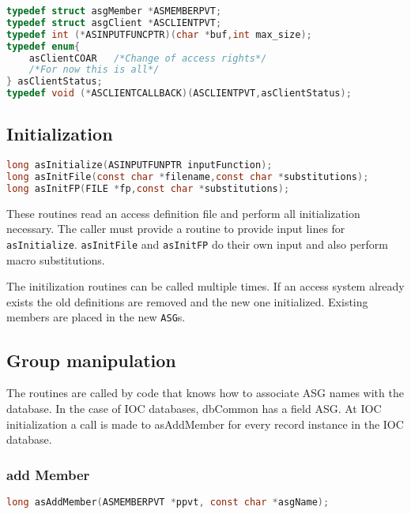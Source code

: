 \begin{lstlisting}[language=C]
typedef struct asgMember *ASMEMBERPVT;
typedef struct asgClient *ASCLIENTPVT;
typedef int (*ASINPUTFUNCPTR)(char *buf,int max_size);
typedef enum{
    asClientCOAR   /*Change of access rights*/
    /*For now this is all*/
} asClientStatus;
typedef void (*ASCLIENTCALLBACK)(ASCLIENTPVT,asClientStatus);

\end{lstlisting}

\subsection{Initialization}

\begin{lstlisting}[language=C]
long asInitialize(ASINPUTFUNPTR inputFunction);
long asInitFile(const char *filename,const char *substitutions);
long asInitFP(FILE *fp,const char *substitutions);
\end{lstlisting}

These routines read an access definition file and perform all initialization necessary. The caller must provide a routine to 
provide input lines for \verb|asInitialize|.
\verb|asInitFile| and \verb|asInitFP| do their own input and also perform macro 
substitutions.

The initilization routines can be called multiple times. If an access system already exists the old definitions are removed 
and the new one initialized. Existing members are placed in the new \verb|ASG|s. 

\subsection{Group manipulation}

The routines are called by code that knows how to associate ASG names with the database. In the case of IOC databases, 
dbCommon has a field ASG. At IOC initialization a call is made to asAddMember for every record instance in the IOC 
database.

\subsubsection{add Member}

\begin{lstlisting}[language=C]
long asAddMember(ASMEMBERPVT *ppvt, const char *asgName);
\end{lstlisting}

